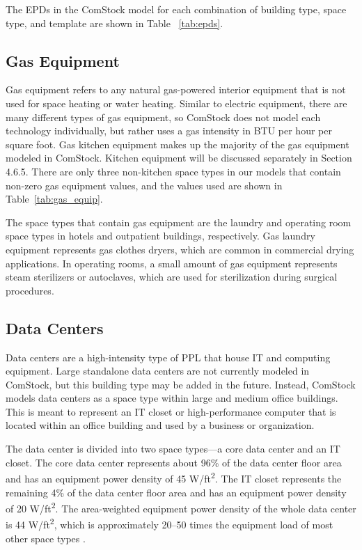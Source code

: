 The EPDs in the ComStock model for each combination of building type, space type, and template are shown in Table ~\ref{tab:epds}.


\subsection{Gas Equipment}

Gas equipment refers to any natural gas-powered interior equipment that is not used for space heating or water heating. Similar to electric equipment, there are many different types of gas equipment, so ComStock does not model each technology individually, but rather uses a gas intensity in BTU per hour per square foot. Gas kitchen equipment makes up the majority of the gas equipment modeled in ComStock. Kitchen equipment will be discussed separately in Section 4.6.5. There are only three non-kitchen space types in our models that contain non-zero gas equipment values, and the values used are shown in Table~\ref{tab:gas_equip}. 



The space types that contain gas equipment are the laundry and operating room space types in hotels and outpatient buildings, respectively. Gas laundry equipment represents gas clothes dryers, which are common in commercial drying applications. In operating rooms, a small amount of gas equipment represents steam sterilizers or autoclaves, which are used for sterilization during surgical procedures.

\subsection{Data Centers}

Data centers are a high-intensity type of PPL that house IT and computing equipment. Large standalone data centers are not currently modeled in ComStock, but this building type may be added in the future. Instead, ComStock models data centers as a space type within large and medium office buildings. This is meant to represent an IT closet or high-performance computer that is located within an office building and used by a business or organization. 

The data center is divided into two space types---a core data center and an IT closet. The core data center represents about 96\% of the data center floor area and has an equipment power density of 45 W/ft\textsuperscript{2}. The IT closet represents the remaining 4\% of the data center floor area and has an equipment power density of 20 W/ft\textsuperscript{2}. The area-weighted equipment power density of the whole data center is 44 W/ft\textsuperscript{2}, which is approximately 20--50 times the equipment load of most other space types \citep{osti_1129366}.

